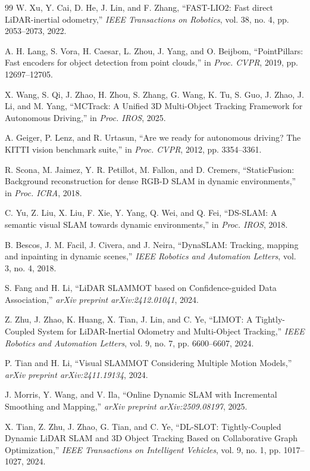 \documentclass[a4paper,12pt]{article}
\begin{document}
\clearpage
{}
\begin{thebibliography}{99}
W. Xu, Y. Cai, D. He, J. Lin, and F. Zhang, ``FAST-LIO2: Fast direct LiDAR-inertial odometry,'' \emph{IEEE Transactions on Robotics}, vol. 38, no. 4, pp. 2053--2073, 2022.

A. H. Lang, S. Vora, H. Caesar, L. Zhou, J. Yang, and O. Beijbom, ``PointPillars: Fast encoders for object detection from point clouds,'' in \emph{Proc. CVPR}, 2019, pp. 12697--12705.

X. Wang, S. Qi, J. Zhao, H. Zhou, S. Zhang, G. Wang, K. Tu, S. Guo, J. Zhao, J. Li, and M. Yang, ``MCTrack: A Unified 3D Multi-Object Tracking Framework for Autonomous Driving,'' in \emph{Proc. IROS}, 2025.

A. Geiger, P. Lenz, and R. Urtasun, ``Are we ready for autonomous driving? The KITTI vision benchmark suite,'' in \emph{Proc. CVPR}, 2012, pp. 3354--3361.

R. Scona, M. Jaimez, Y. R. Petillot, M. Fallon, and D. Cremers, ``StaticFusion: Background reconstruction for dense RGB-D SLAM in dynamic environments,'' in \emph{Proc. ICRA}, 2018.

C. Yu, Z. Liu, X. Liu, F. Xie, Y. Yang, Q. Wei, and Q. Fei, ``DS-SLAM: A semantic visual SLAM towards dynamic environments,'' in \emph{Proc. IROS}, 2018.

B. Bescos, J. M. Facil, J. Civera, and J. Neira, ``DynaSLAM: Tracking, mapping and inpainting in dynamic scenes,'' \emph{IEEE Robotics and Automation Letters}, vol. 3, no. 4, 2018.

S. Fang and H. Li, ``LiDAR SLAMMOT based on Confidence-guided Data Association,'' \emph{arXiv preprint arXiv:2412.01041}, 2024.

Z. Zhu, J. Zhao, K. Huang, X. Tian, J. Lin, and C. Ye, ``LIMOT: A Tightly-Coupled System for LiDAR-Inertial Odometry and Multi-Object Tracking,'' \emph{IEEE Robotics and Automation Letters}, vol. 9, no. 7, pp. 6600--6607, 2024.

P. Tian and H. Li, ``Visual SLAMMOT Considering Multiple Motion Models,'' \emph{arXiv preprint arXiv:2411.19134}, 2024.

J. Morris, Y. Wang, and V. Ila, ``Online Dynamic SLAM with Incremental Smoothing and Mapping,'' \emph{arXiv preprint arXiv:2509.08197}, 2025.

X. Tian, Z. Zhu, J. Zhao, G. Tian, and C. Ye, ``DL-SLOT: Tightly-Coupled Dynamic LiDAR SLAM and 3D Object Tracking Based on Collaborative Graph Optimization,'' \emph{IEEE Transactions on Intelligent Vehicles}, vol. 9, no. 1, pp. 1017--1027, 2024.

\end{thebibliography}
\end{document}
